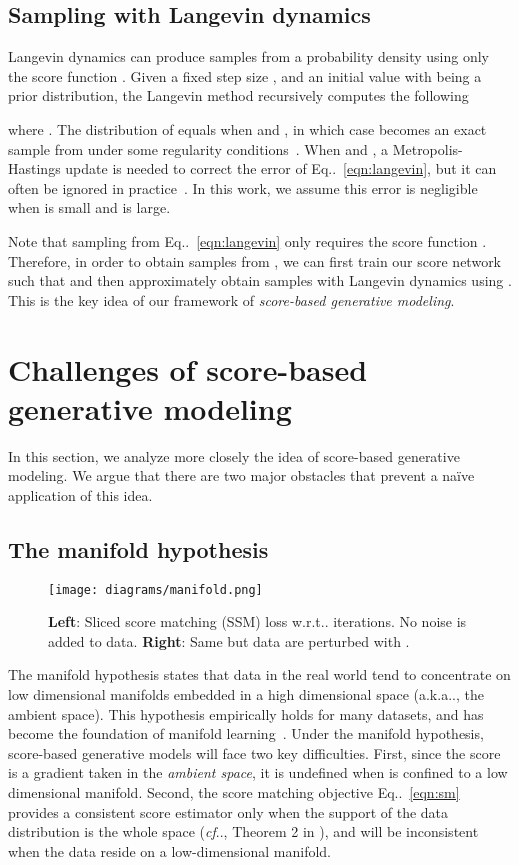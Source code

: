 \documentclass{article}
\makeatletter
\def\@onedot{\ifx\@let@token.\else.\null\fi\xspace}
\DeclareRobustCommand\onedot{\futurelet\@let@token\@onedot}
\newcommand{\eqnref}[1]{Eq\onedot~\eqref{#1}}
\def\cf{\emph{cf}\onedot}
\def\wrt{w.r.t\onedot}
\def\aka{a.k.a\onedot}
\makeatother
\begin{document}
\subsection{Sampling with Langevin dynamics}
Langevin dynamics can produce samples from a probability density  using only the score function . Given a fixed step size , and an initial value  with  being a prior distribution, the Langevin method recursively computes the following

where . 
The distribution of  equals  when  and , in which case  becomes an exact sample from  under some regularity conditions~\cite{welling2011bayesian}. When  and , a Metropolis-Hastings update is needed to correct the error of \eqnref{eqn:langevin}, but 
it can often be ignored in practice~\cite{chen2014stochastic,du2019implicit,nijkamp2019anatomy}. 
In this work, we assume this error is negligible when  is small and  is large.

Note that sampling from \eqnref{eqn:langevin} only requires the score function . Therefore, in order to obtain samples from , we can first train our score network such that  and then approximately obtain samples with Langevin dynamics using . This is the key idea of our framework of \emph{score-based generative modeling}.


 \section{Challenges of score-based generative modeling}\label{sec:challenges}
In this section, we analyze more closely the idea of score-based generative modeling. We argue that there are two major obstacles that prevent a na\"{i}ve application of this idea. 
\subsection{The manifold hypothesis}
\begin{wrapfigure}[11]{r}{0.5\textwidth}
    \centering
    \vspace{-1em}
    \texttt{[image: diagrams/manifold.png]}
    \caption{\textbf{Left}: Sliced score matching (SSM) loss \wrt iterations. No noise is added to data. \textbf{Right}: Same but data are perturbed with .}\label{fig:manifold}
\end{wrapfigure}
The manifold hypothesis states that data in the real world tend to concentrate on low dimensional manifolds embedded in a high dimensional space (\aka, the ambient space). This hypothesis empirically holds for many datasets, and has become the foundation of manifold learning~\cite{belkin2003laplacian,roweis2000nonlinear}. Under the manifold hypothesis, score-based generative models will face two key difficulties. First, since the score  is a gradient taken in the \emph{ambient space}, it is undefined when  is confined to a low dimensional manifold. Second, the score matching objective \eqnref{eqn:sm} provides a consistent score estimator only when the support of the data distribution is the whole space (\cf, Theorem 2 in \cite{hyvarinen2005estimation}), and will be inconsistent when the data reside on a low-dimensional manifold.
\end{document}
